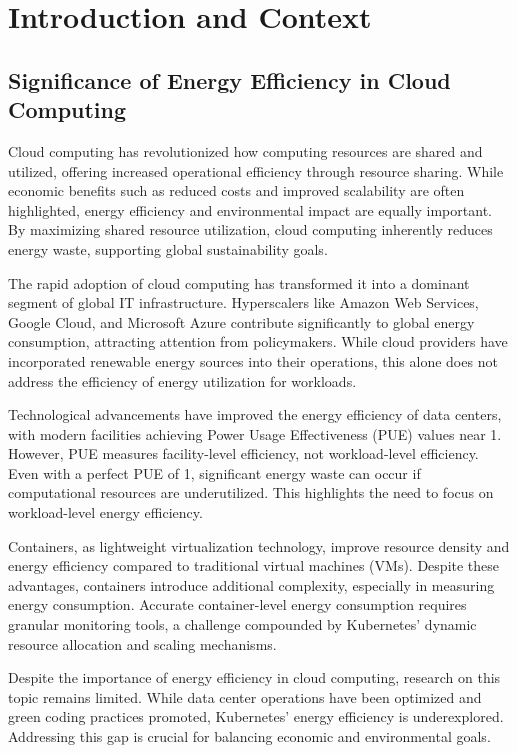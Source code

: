 \chapter{Introduction and Context} %
\label{Chapter1}

\section{Significance of Energy Efficiency in Cloud Computing}

Cloud computing has revolutionized how computing resources are shared and utilized, offering increased operational efficiency through resource sharing. While economic benefits such as reduced costs and improved scalability are often highlighted, energy efficiency and environmental impact are equally important. By maximizing shared resource utilization, cloud computing inherently reduces energy waste, supporting global sustainability goals.

The rapid adoption of cloud computing has transformed it into a dominant segment of global IT infrastructure. Hyperscalers like Amazon Web Services, Google Cloud, and Microsoft Azure contribute significantly to global energy consumption, attracting attention from policymakers. While cloud providers have incorporated renewable energy sources into their operations, this alone does not address the efficiency of energy utilization for workloads.

Technological advancements have improved the energy efficiency of data centers, with modern facilities achieving Power Usage Effectiveness (PUE) values near 1. However, PUE measures facility-level efficiency, not workload-level efficiency. Even with a perfect PUE of 1, significant energy waste can occur if computational resources are underutilized. This highlights the need to focus on workload-level energy efficiency.

Containers, as lightweight virtualization technology, improve resource density and energy efficiency compared to traditional virtual machines (VMs). Despite these advantages, containers introduce additional complexity, especially in measuring energy consumption. Accurate container-level energy consumption requires granular monitoring tools, a challenge compounded by Kubernetes’ dynamic resource allocation and scaling mechanisms.

Despite the importance of energy efficiency in cloud computing, research on this topic remains limited. While data center operations have been optimized and green coding practices promoted, Kubernetes’ energy efficiency is underexplored. Addressing this gap is crucial for balancing economic and environmental goals.

